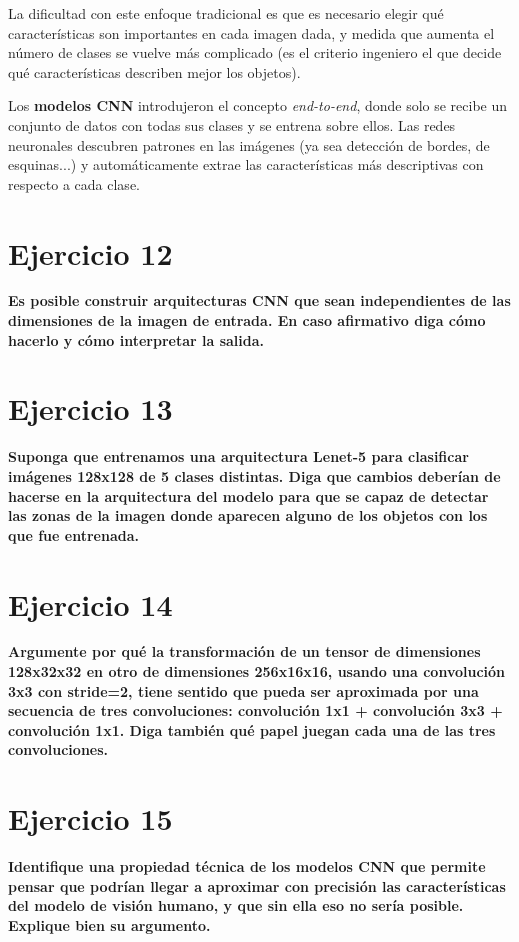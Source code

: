 \documentclass[11pt,a4paper]{article}
\begin{document}
La dificultad con este enfoque tradicional es que es necesario elegir qué características son importantes en cada imagen dada, y medida que aumenta el número de clases
se vuelve más complicado (es el criterio ingeniero el que decide qué características describen mejor los objetos).

Los \textbf{modelos CNN} introdujeron el concepto \textit{end-to-end}, donde solo se recibe un conjunto de datos con todas sus clases y se entrena sobre ellos. Las redes
neuronales descubren patrones en las imágenes (ya sea detección de bordes, de esquinas...) y automáticamente extrae las características más descriptivas con respecto a
cada clase.


\section*{Ejercicio 12}

\textbf{Es posible construir arquitecturas CNN que sean independientes de las dimensiones de la imagen de entrada. En caso afirmativo diga cómo hacerlo y cómo
interpretar la salida.}




\section*{Ejercicio 13}

\textbf{Suponga que entrenamos una arquitectura Lenet-5 para clasificar imágenes 128x128 de 5 clases distintas. Diga que cambios deberían de hacerse en la arquitectura
del modelo para que se capaz de detectar las zonas de la imagen donde aparecen alguno de los objetos con los que fue entrenada.}



\section*{Ejercicio 14}

\textbf{Argumente por qué la transformación de un tensor de dimensiones 128x32x32 en otro de dimensiones 256x16x16, usando una convolución 3x3 con stride=2, tiene sentido
que pueda ser aproximada por una secuencia de tres convoluciones: convolución 1x1 + convolución 3x3 + convolución 1x1. Diga también qué papel juegan cada una de las tres
convoluciones.}




\section*{Ejercicio 15}

\textbf{Identifique una propiedad técnica de los modelos CNN que permite pensar que podrían llegar a aproximar con precisión las características del modelo de visión
humano, y que sin ella eso no sería posible. Explique bien su argumento.}
\end{document}
